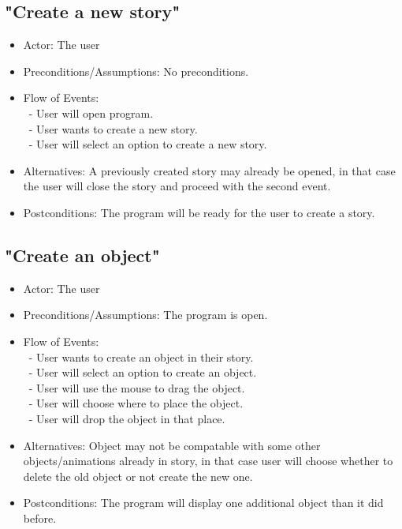 \documentclass[12pt]{article}
\begin{document}
	\subsection{"Create a new story"}
\begin{itemize}
	\item Actor: The user
	\item Preconditions/Assumptions: No preconditions.
	\item Flow of Events: \\
	 	\ - User will open program. \\
		\ - User wants to create a new story. \\
		\ - User will select an option to create a new story.
	
	\item Alternatives: A previously created story may already be opened, in that case the user will close the story and proceed with the second event.
	\item Postconditions: The program will be ready for the user to create a story.
\end{itemize}

	\subsection{"Create an object"}
\begin{itemize}
	\item Actor: The user
	\item Preconditions/Assumptions: The program is open.
	\item Flow of Events: \\
	 	\ - User wants to create an object in their story. \\
		\ - User will select an option to create an object. \\
		\ - User will use the mouse to drag the object. \\
		\ - User will choose where to place the object. \\
		\ - User will drop the object in that place. \\
	\item Alternatives: Object may not be compatable with some other objects/animations already in story, in that case user will choose whether to delete the old object or not create the new one.
	\item Postconditions: The program will display one additional object than it did before.
\end{itemize}
\end{document}
